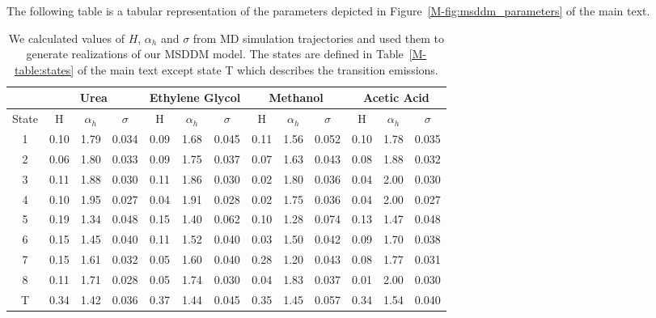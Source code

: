 \documentclass{article}
\begin{document}
  The following table is a tabular representation of the parameters 
  depicted in Figure~\ref{M-fig:msddm_parameters} of the main text.
  
  \begin{table}[h]
  \centering
  \begin{tabular}{|c|c|c|c|c|c|c|c|c|c|c|c|c|}
  \hline
  & \multicolumn{3}{c|}{Urea} & \multicolumn{3}{c|}{Ethylene Glycol} & \multicolumn{3}{c|}{Methanol} & \multicolumn{3}{c|}{Acetic Acid} \\\hline
  State & H     &$\alpha_h$& $\sigma$ & H    &$\alpha_h$& $\sigma$   & H     &$\alpha_h$& $\sigma$ & H    &$\alpha_h$& $\sigma$ \\\hline
  1     & 0.10  & 1.79     & 0.034    & 0.09 & 1.68     & 0.045      & 0.11  & 1.56     & 0.052    & 0.10 & 1.78     & 0.035    \\
  2     & 0.06  & 1.80     & 0.033    & 0.09 & 1.75     & 0.037      & 0.07  & 1.63     & 0.043    & 0.08 & 1.88     & 0.032    \\
  3     & 0.11  & 1.88     & 0.030    & 0.11 & 1.86     & 0.030      & 0.02  & 1.80     & 0.036    & 0.04 & 2.00     & 0.030    \\
  4     & 0.10  & 1.95     & 0.027    & 0.04 & 1.91     & 0.028      & 0.02  & 1.75     & 0.036    & 0.04 & 2.00     & 0.027    \\
  5     & 0.19  & 1.34     & 0.048    & 0.15 & 1.40     & 0.062      & 0.10  & 1.28     & 0.074    & 0.13 & 1.47     & 0.048    \\
  6     & 0.15  & 1.45     & 0.040    & 0.11 & 1.52     & 0.040      & 0.03  & 1.50     & 0.042    & 0.09 & 1.70     & 0.038    \\
  7     & 0.15  & 1.61     & 0.032    & 0.05 & 1.60     & 0.040      & 0.28  & 1.20     & 0.043    & 0.08 & 1.77     & 0.031    \\
  8     & 0.11  & 1.71     & 0.028    & 0.05 & 1.74     & 0.030      & 0.04  & 1.83     & 0.037    & 0.01 & 2.00     & 0.030    \\
  T     & 0.34  & 1.42     & 0.036    & 0.37 & 1.44     & 0.045      & 0.35  & 1.45     & 0.057    & 0.34 & 1.54     & 0.040    \\\hline
  \end{tabular}
  \caption{We calculated values of $H$, $\alpha_h$ and $\sigma$ from MD simulation
  trajectories and used them to generate realizations of our MSDDM model. The states
  are defined in Table~\ref{M-table:states} of the main text except state T which 
  describes the transition emissions.}\label{table:msddm_params}
  \end{table}  
  
\end{document}
